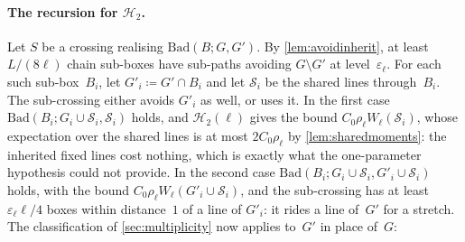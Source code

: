 \documentclass[11pt,letterpaper]{article}
\newcommand{\Bad}{\mathrm{Bad}}
\begin{document}
\paragraph{The recursion for $\mathcal H_2$.} Let $S$ be a crossing realising $\Bad(B;G,G')$. By \cref{lem:avoidinherit}, at least $L/(8\ell)$ chain sub-boxes have sub-paths avoiding $G\setminus G'$ at level~$\varepsilon_\ell$. For each such sub-box~$B_i$, let $G'_i\coloneqq G'\cap B_i$ and let $\mathcal S_i$ be the shared lines through~$B_i$. The sub-crossing either avoids $G'_i$ as well, or uses it. In the first case $\Bad(B_i;G_i\cup\mathcal S_i,\mathcal S_i)$ holds, and $\mathcal H_2(\ell)$ gives the bound $C_0\rho_\ell W_\ell(\mathcal S_i)$, whose expectation over the shared lines is at most $2C_0\rho_\ell$ by \cref{lem:sharedmoments}: the inherited fixed lines cost nothing, which is exactly what the one-parameter hypothesis could not provide. In the second case $\Bad(B_i;G_i\cup\mathcal S_i,G'_i\cup\mathcal S_i)$ holds, with the bound $C_0\rho_\ell W_\ell(G'_i\cup\mathcal S_i)$, and the sub-crossing has at least $\varepsilon_\ell\ell/4$ boxes within distance~$1$ of a line of $G'_i$: it rides a line of~$G'$ for a stretch. The classification of \cref{sec:multiplicity} now applies to~$G'$ in place of~$G$:
\end{document}
